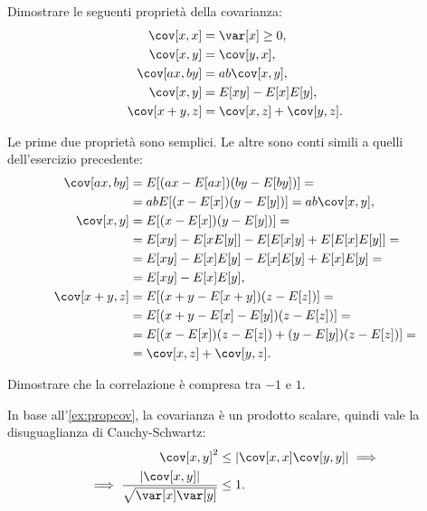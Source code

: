 \begin{exercise}\label{ex:propcov}
    Dimostrare le seguenti proprietà della covarianza:
	\begin{align*}
        \cov[x,x] &= \var[x] \ge 0, \\
        \cov[x,y] &= \cov[y,x], \\
		\cov[ax,by] &= ab\cov[x,y], \\
		\cov[x,y] &= E[xy] - E[x]E[y], \\
		\cov[x+y,z] &= \cov[x,z] + \cov[y,z].
	\end{align*}
\end{exercise}

\begin{solution}
    Le prime due proprietà sono semplici. Le altre sono conti simili a quelli
    dell'esercizio precedente:
    \begin{align*}
        \cov[ax,by] &= E[(ax - E[ax])(by - E[by])] = \\
        &= abE[(x - E[x])(y - E[y])]
        = ab\cov[x,y], \\
        \cov[x,y] &= E[(x - E[x])(y - E[y])] = \\
        &= E[xy] - E[xE[y]] - E[E[x]y] + E[E[x]E[y]] = \\
        &= E[xy] - E[x]E[y] - E[x]E[y] + E[x]E[y] = \\
        &= E[xy] - E[x]E[y], \\
        \cov[x+y,z] &= E[(x+y - E[x+y])(z - E[z])] = \\
        &= E[(x+y-E[x]-E[y])(z - E[z])] = \\
        &= E[(x - E[x])(z - E[z]) + (y - E[y])(z - E[z])] = \\
        &= \cov[x,z] + \cov[y,z].
    \end{align*}
\end{solution}

\begin{exercise}
    Dimostrare che la correlazione è compresa tra $-1$ e $1$.
\end{exercise}

\begin{solution}
    In base all'\autoref{ex:propcov}, la covarianza è un prodotto scalare,
    quindi vale la disuguaglianza di Cauchy-Schwartz:
    \begin{align*}
        \cov[x, y]^2 &\le |\cov[x, x]\cov[y, y]| \implies \\
        \implies \frac{|\cov[x, y]|}{\sqrt{\var[x]\var[y]}} &\le 1.
    \end{align*}
\end{solution}


